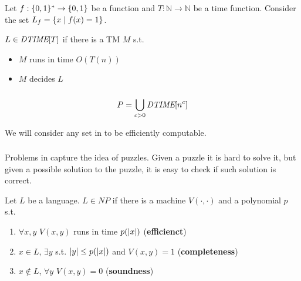     \begin{definition}[\dtime]\label{def:dtime}
        Let $f : \{ 0,1 \}^* \rightarrow \{ 0,1 \}$ be a function and $T : \mathbb{N} \rightarrow \mathbb{N}$ be a time function.
        Consider the set $L_f = \{ x \; \vert \; f(x) = 1 \}$.

        $L \in \textit{DTIME}[T]$ if there is a TM $M$ s.t.
        \begin{itemize}
            \item $M$ runs in time $O(T(n))$
            \item $M$ decides $L$
        \end{itemize}
    \end{definition}

    \subsubsection{\PP}\label{subsubsec:p}
        \begin{definition}[\PP]\label{def:p}
            \[ P = \bigcup_{c > 0} \textit{DTIME}[n^c] \]

            We will consider any set in \PP{} to be efficiently computable.
        \end{definition}

    \subsubsection{\NP}\label{subsubsec:np}
        Problems in \NP{} capture the idea of puzzles.
        Given a puzzle it is hard to solve it, but given a possible solution to the puzzle, it is easy to check if such solution is correct.

        \begin{definition}[\NP]\label{def:np}
            Let $L$ be a language. $L \in NP$ if there is a machine $V(\cdot, \cdot)$ and a polynomial $p$ s.t.
            \begin{enumerate}
                \item $\forall x, y$ $V(x,y)$ runs in time $p(\vert x \vert)$ (\textbf{efficienct})
                \item $x \in L$, $\exists y$ s.t. $\vert y \vert \leq p(\vert x \vert)$ and $V(x,y) = 1$ (\textbf{completeness})
                \item $x \not\in L$, $\forall y$ $V(x,y) = 0$ (\textbf{soundness})
            \end{enumerate}
        \end{definition}

